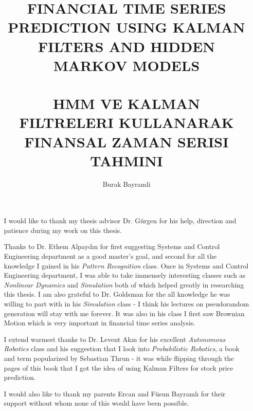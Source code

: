 

\title{FINANCIAL TIME SERIES PREDICTION USING KALMAN FILTERS AND HIDDEN
  MARKOV MODELS \\ \\ HMM VE KALMAN FILTRELERI KULLANARAK FINANSAL ZAMAN SERISI TAHMINI}


\author{Burak Bayramli}









\makemstitle        %

\makeapprovalpage

\begin{acknowledgements}
I would like to thank my thesis advisor Dr. Gürgen for his help, direction and
patience during my work on this thesis. 

Thanks to Dr. Ethem Alpaydın for first suggesting Systems and Control
Engineering department as a good master's goal, and second for all the knowledge
I gained in his {\em Pattern Recognition} class. Once in Systems and Control
Engineering department, I was able to take immensely interesting classes such as
{\em Nonlinear Dynamics} and {\em Simulation} both of which helped greatly in
researching this thesis. I am also grateful to Dr. Goldsman for the all
knowledge he was willing to part with in his {\em Simulation} class - I think
his lectures on pseudorandom generation will stay with me forever. It was also
in his class I first saw Brownian Motion which is very important in financial
time series analysis.

I extend warmest thanks to Dr. Levent Akın for his excellent {\em Autonomous
Robotics} class and his suggestion that I look into {\em Probabilistic
Robotics}, a book and term popularized by Sebastian Thrun - it was while
flipping through the pages of this book that I got the idea of using Kalman
Filters for stock price prediction.

I would also like to thank my parents Ercan and Füsun Bayramlı for their support
without whom none of this would have been possible.
\end{acknowledgements}

